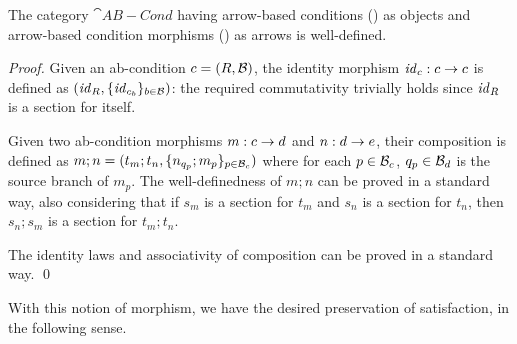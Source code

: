 \begin{proposition}
  The category $\cat{AB-Cond}$ having arrow-based conditions () as objects and arrow-based condition morphisms () as arrows is well-defined.
\end{proposition}

\begin{proof}
  Given an ab-condition $c=(R,\mathcal{B})$, the identity morphism $\mathit{id}_c:c\rightarrow c$ is defined as $(\mathit{id}_R,\{{\mathit{id}_{c_b}}\}_{b\in \mathcal{B}})$: the required commutativity trivially holds since $\mathit{id}_R$ is a section for itself.
  
Given two ab-condition morphisms $m:c\rightarrow d$ and $n:d\rightarrow e$, their composition is defined as $m;n=(t_m;t_n,\{{n_{q_p};m_p}\}_{p\in \mathcal{B}_c})$ where for each $p\in \mathcal{B}_c$, $q_p\in \mathcal{B}_d$ is the source branch of $m_p$.
The well-definedness of $m;n$ can be proved in a standard way, also considering that if $s_m$ is a section for $t_m$ and $s_n$ is a section for $t_n$, then $s_n;s_m$ is a section for $t_m;t_n$.

The identity laws and associativity of composition can be proved in a standard way. \qed
\end{proof}

With this notion of morphism, we have the desired preservation of satisfaction, in the following sense.

